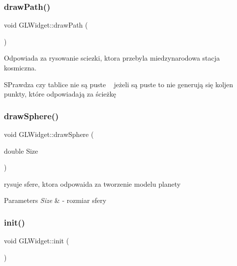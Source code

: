 \subsubsection{\texorpdfstring{draw\+Path()}{drawPath()}}
{\footnotesize\ttfamily void G\+L\+Widget\+::draw\+Path (\begin{DoxyParamCaption}{ }\end{DoxyParamCaption})}



Odpowiada za rysowanie sciezki, ktora przebyla miedzynarodowa stacja kosmiczna. 

S\+Prawdza czy tablice nie są puste ~\newline
jeżeli są puste to nie generują się koljen punkty, które odpowiadają za ścieżkę \mbox{\label{class_g_l_widget_a5088e389af053b34a5562848ca657b60}} 
\subsubsection{\texorpdfstring{draw\+Sphere()}{drawSphere()}}
{\footnotesize\ttfamily void G\+L\+Widget\+::draw\+Sphere (\begin{DoxyParamCaption}\item[{double}]{Size }\end{DoxyParamCaption})}



rysuje sfere, ktora odpowaida za tworzenie modelu planety 


\begin{DoxyParams}{Parameters}
{\em Size} & -\/ rozmiar sfery \\
\hline
\end{DoxyParams}
\mbox{\label{class_g_l_widget_ac25c4189967c4f728dc94fb96e22fc65}} 
\subsubsection{\texorpdfstring{init()}{init()}}
{\footnotesize\ttfamily void G\+L\+Widget\+::init (\begin{DoxyParamCaption}{ }\end{DoxyParamCaption})\hspace{0.3cm}{\ttfamily [protected]}}

